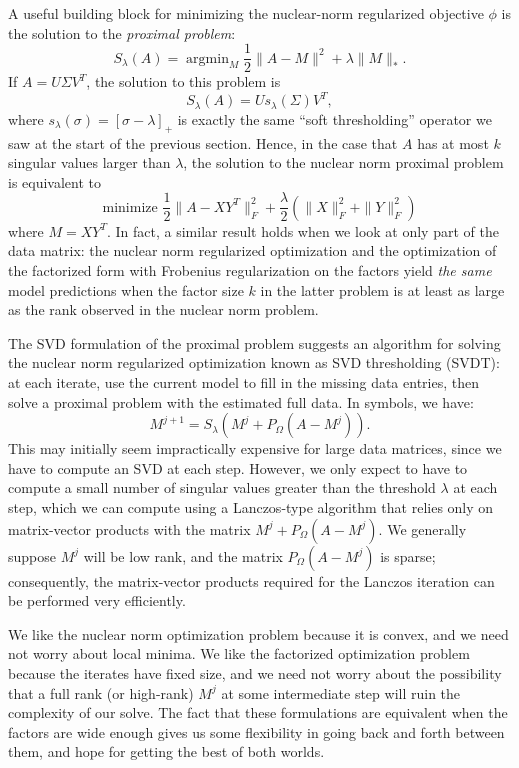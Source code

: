 \documentclass[12pt, leqno]{article} %
\begin{document}
A useful building block for minimizing the nuclear-norm regularized
objective $\phi$ is the solution to the {\em proximal problem}:
\[
S_\lambda(A) =
  \operatorname{argmin}_M \frac{1}{2} \|A-M\|^2 + \lambda \|M\|_*.
\]
If $A = U \Sigma V^T$, the solution to this problem is
\[
  S_{\lambda}(A) = U s_{\lambda}(\Sigma) V^T,
\]
where $s_{\lambda}(\sigma) = [\sigma-\lambda]_+$ is exactly the same
``soft thresholding'' operator we saw at the start of the previous
section.  Hence, in the case that $A$ has at most $k$ singular values
larger than $\lambda$, the solution to the nuclear norm proximal
problem is equivalent to
\[
\mbox{minimize }
  \frac{1}{2} \|A-XY^T\|_F^2 + \frac{\lambda}{2} (\|X\|_F^2 + \|Y\|_F^2)
\]
where $M = XY^T$.  In fact, a similar result holds when we look at
only part of the data matrix: the nuclear norm regularized
optimization and the optimization of the factorized form with
Frobenius regularization on the factors yield {\em the same} model
predictions when the factor size $k$ in the latter problem is at least
as large as the rank observed in the nuclear norm problem.

The SVD formulation of the proximal problem suggests an
algorithm for solving the nuclear norm regularized optimization
known as SVD thresholding (SVDT):
at each iterate, use the current model to fill in the missing data
entries, then solve a proximal problem with the estimated full data.
In symbols, we have:
\[
  M^{j+1} = S_{\lambda}(M^{j} + P_{\Omega}(A-M^{j})).
\]
This may initially seem impractically expensive for large data
matrices, since we have to compute an SVD at each step.  However, we
only expect to have to compute a small number of singular values
greater than the threshold $\lambda$ at each step, which we can
compute using a Lanczos-type algorithm that relies only on
matrix-vector products with the matrix
$M^{j} + P_{\Omega}(A-M^{j})$.  We generally suppose $M^{j}$
will be low rank, and the matrix $P_{\Omega}(A-M^{j})$ is sparse;
consequently, the matrix-vector products required for the Lanczos
iteration can be performed very efficiently.

We like the nuclear norm optimization problem because it is convex,
and we need not worry about local minima.  We like the factorized
optimization problem because the iterates have fixed size, and we need
not worry about the possibility that a full rank (or high-rank) $M^{j}$
at some intermediate step will ruin the complexity of our solve.
The fact that these formulations are equivalent when the factors are
wide enough gives us some flexibility in going back and forth between
them, and hope for getting the best of both worlds.
\end{document}
